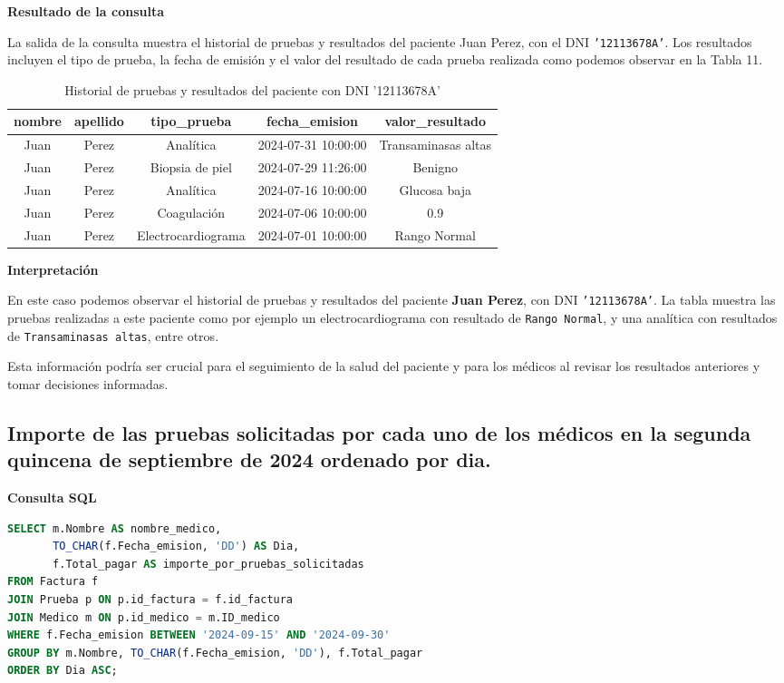 \documentclass[spanish]{article}
\begin{document}
\textbf{Resultado de la consulta}

La salida de la consulta muestra el historial de pruebas y resultados del paciente Juan Perez, con el DNI \texttt{'12113678A'}. Los resultados incluyen el tipo de prueba, la fecha de emisión y el valor del resultado de cada prueba realizada como podemos observar en la Tabla 11.

\begin{table}[h!]
\centering
\begin{tabular}{|c|c|c|c|c|}
\hline
\textbf{nombre} & \textbf{apellido} & \textbf{tipo\_prueba} & \textbf{fecha\_emision} & \textbf{valor\_resultado} \\
\hline
Juan & Perez & Analítica & 2024-07-31 10:00:00 & Transaminasas altas \\
Juan & Perez & Biopsia de piel & 2024-07-29 11:26:00 & Benigno \\
Juan & Perez & Analítica & 2024-07-16 10:00:00 & Glucosa baja \\
Juan & Perez & Coagulación & 2024-07-06 10:00:00 & 0.9 \\
Juan & Perez & Electrocardiograma & 2024-07-01 10:00:00 & Rango Normal \\
\hline
\end{tabular}
\caption{Historial de pruebas y resultados del paciente con DNI '12113678A'}
\label{tab:historial_prueba}
\end{table}

\textbf{Interpretación}

En este caso podemos observar el historial de pruebas y resultados del paciente \textbf{Juan Perez}, con DNI \texttt{'12113678A'}. La tabla muestra las pruebas realizadas a este paciente como por ejemplo un electrocardiograma con resultado de \texttt{Rango Normal}, y una analítica con resultados de \texttt{Transaminasas altas}, entre otros. 

Esta información podría ser crucial para el seguimiento de la salud del paciente y para los médicos al revisar los resultados anteriores y tomar decisiones informadas.

\subsection{Importe de las pruebas solicitadas por cada uno de los médicos en la segunda quincena de septiembre de 2024 ordenado por dia.}

\textbf{Consulta SQL}
\begin{lstlisting}[language=SQL]
SELECT m.Nombre AS nombre_medico, 
       TO_CHAR(f.Fecha_emision, 'DD') AS Dia, 
       f.Total_pagar AS importe_por_pruebas_solicitadas
FROM Factura f
JOIN Prueba p ON p.id_factura = f.id_factura
JOIN Medico m ON p.id_medico = m.ID_medico 
WHERE f.Fecha_emision BETWEEN '2024-09-15' AND '2024-09-30'
GROUP BY m.Nombre, TO_CHAR(f.Fecha_emision, 'DD'), f.Total_pagar
ORDER BY Dia ASC;
\end{lstlisting}
\end{document}
